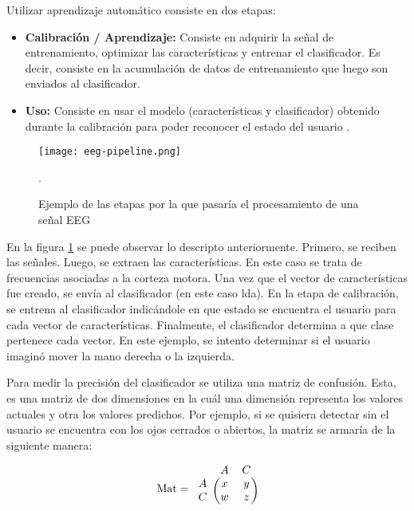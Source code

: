 Utilizar aprendizaje automático consiste en dos etapas:

\begin{itemize}
	\item \textbf{Calibración / Aprendizaje:} Consiste en adquirir la señal de entrenamiento, optimizar las características y entrenar el clasificador. Es decir, consiste en la acumulación de datos de entrenamiento que luego son enviados al clasificador.
	\item \textbf{Uso:} Consiste en usar el modelo (características y clasificador) obtenido durante la calibración para poder reconocer el estado del usuario \cite{eeg-tutorial}. 
\end{itemize}

\begin{figure}[H]
	\centering
    \texttt{[image: eeg-pipeline.png]}
    \caption{Ejemplo de las etapas por la que pasaría el procesamiento de una señal EEG \cite{eeg-tutorial}}.
	\label{fig:eeg-pipeline}
\end{figure}

En la figura \ref{fig:eeg-pipeline} se puede observar lo descripto anteriormente. Primero, se reciben las señales. Luego, se extraen las características. En este caso se trata de frecuencias asociadas a la corteza motora. Una vez que el vector de características fue creado, se envía al clasificador (en este caso \acrshort{lda}). En la etapa de calibración, se entrena al clasificador indicándole en que estado se encuentra el usuario para cada vector de características.  Finalmente, el clasificador determina a que clase pertenece cada vector. En este ejemplo, se intento determinar si el usuario imaginó mover la mano derecha o la izquierda. 

Para medir la precisión del clasificador se utiliza una matriz de confusión. Esta, es una matriz de dos dimensiones en la cuál una dimensión representa los valores actuales y otra los valores predichos. Por ejemplo, si se quisiera detectar sin el usuario se encuentra con los ojos cerrados o abiertos, la matriz se armaría de la siguiente manera:

\[
\textrm{Mat} = \begin{blockarray}{ccc}
& A & C \\
\begin{block}{c(cc)}
  A & x & y \\
  C & w & z \\
\end{block}
\end{blockarray}
 \]
 
